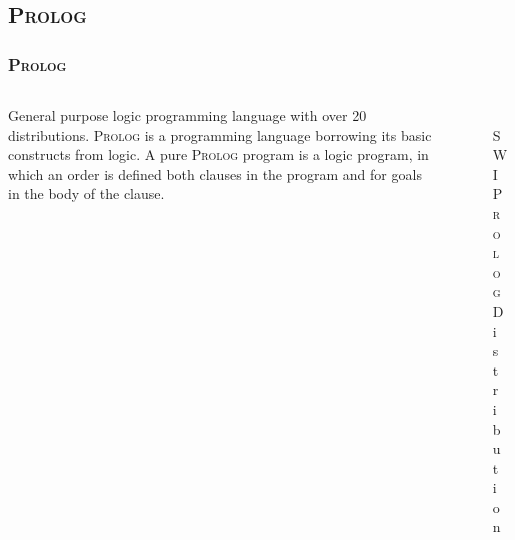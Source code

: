 \documentclass[hideothersubsections, t, aspectratio=1610]{beamer}
\newcommand{\progLang}[1]{\textsc{#1}}
\begin{document}
\subsection{\progLang{Prolog}}
\begin{frame}
\frametitle{\progLang{Prolog}}
  \begin{columns}[T]
    \begin{column}{.6\textwidth}
     \begin{block}{}
General purpose logic programming language with over 20 distributions. \progLang{Prolog} is a programming language borrowing its basic 
constructs from logic. A pure \progLang{Prolog} program is a logic program, in which an order is defined both clauses in the program and 
for goals in the body of the clause.
    \end{block}
    \end{column}
    \begin{column}{.4\textwidth}
    \begin{block}{}
\begin{figure}
    \includegraphics[width=\textwidth]{swipl.png} 
    \caption{\textsc{SWI Prolog} Distribution}
 \end{figure}   
    \end{block}
    \end{column}
  \end{columns}
\end{frame}




\end{document}

